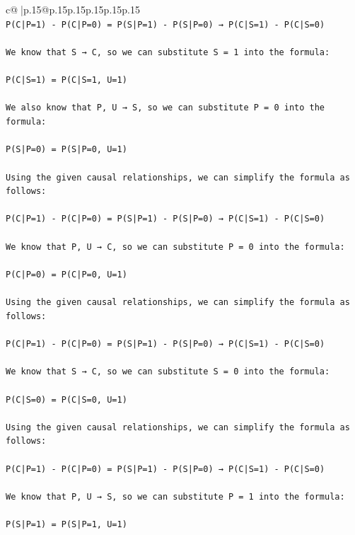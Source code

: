 \documentclass{article}
\begin{document}
{\begin{supertabular}{c@{$\;$}|p{.15\linewidth}@{}p{.15\linewidth}p{.15\linewidth}p{.15\linewidth}p{.15\linewidth}p{.15\linewidth}}
{{{\\ 
\texttt{P(C|P=1) {-} P(C|P=0) = P(S|P=1) {-} P(S|P=0) → P(C|S=1) {-} P(C|S=0)} \\
\\ 
\texttt{We know that S → C, so we can substitute S = 1 into the formula:} \\
\\ 
\texttt{P(C|S=1) = P(C|S=1, U=1)} \\
\\ 
\texttt{We also know that P, U → S, so we can substitute P = 0 into the formula:} \\
\\ 
\texttt{P(S|P=0) = P(S|P=0, U=1)} \\
\\ 
\texttt{Using the given causal relationships, we can simplify the formula as follows:} \\
\\ 
\texttt{P(C|P=1) {-} P(C|P=0) = P(S|P=1) {-} P(S|P=0) → P(C|S=1) {-} P(C|S=0)} \\
\\ 
\texttt{We know that P, U → C, so we can substitute P = 0 into the formula:} \\
\\ 
\texttt{P(C|P=0) = P(C|P=0, U=1)} \\
\\ 
\texttt{Using the given causal relationships, we can simplify the formula as follows:} \\
\\ 
\texttt{P(C|P=1) {-} P(C|P=0) = P(S|P=1) {-} P(S|P=0) → P(C|S=1) {-} P(C|S=0)} \\
\\ 
\texttt{We know that S → C, so we can substitute S = 0 into the formula:} \\
\\ 
\texttt{P(C|S=0) = P(C|S=0, U=1)} \\
\\ 
\texttt{Using the given causal relationships, we can simplify the formula as follows:} \\
\\ 
\texttt{P(C|P=1) {-} P(C|P=0) = P(S|P=1) {-} P(S|P=0) → P(C|S=1) {-} P(C|S=0)} \\
\\ 
\texttt{We know that P, U → S, so we can substitute P = 1 into the formula:} \\
\\ 
\texttt{P(S|P=1) = P(S|P=1, U=1)} \\
}}}
\end{supertabular}}
\end{document}
